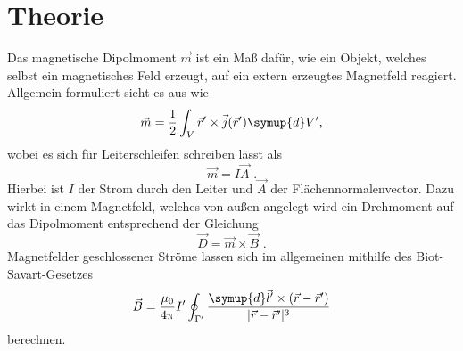 \section{Theorie}
\label{sec:Theorie}

Das magnetische Dipolmoment $\vec{m}$ ist ein Maß dafür, wie ein Objekt, welches selbst ein magnetisches Feld erzeugt, auf ein extern erzeugtes
Magnetfeld reagiert. Allgemein formuliert sieht es aus wie
\begin{equation}
    \vec{m}=\frac{1}{2}\int_{V}\vec{r}'\times\vec{j}(\vec{r}')\symup{d}V' \text{,}
\end{equation}
wobei es sich für Leiterschleifen schreiben lässt als
\begin{equation}
    \vec{m}=I\vec{A}\text{ .}
\end{equation}
Hierbei ist $I$ der Strom durch den Leiter und $\vec{A}$ der Flächennormalenvector. Dazu wirkt in einem Magnetfeld,
welches von außen angelegt wird ein Drehmoment auf das Dipolmoment entsprechend der Gleichung
\begin{equation}
    \vec{D}=\vec{m}\times\vec{B}\text{ .}
    \label{eqn:MagDreh}
\end{equation}
Magnetfelder geschlossener Ströme lassen sich im allgemeinen mithilfe des Biot-Savart-Gesetzes
\begin{equation}
    \vec{B}=\frac{\mu_0}{4\pi}I'\oint_{\Gamma'}\frac{\symup{d}\vec{l}'\times(\vec{r}-\vec{r}')}{|\vec{r}-\vec{r}'|^3}
    \label{eqn:Biot}
\end{equation} 
berechnen. \\

